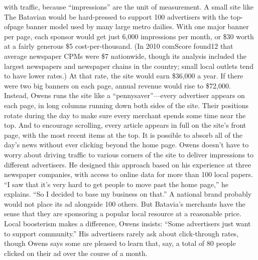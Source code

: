 with traffic, because ``impressions'' are the unit of measurement. A small site like
The Batavian would be hard-pressed to support 100 advertisers with the top-ofpage
banner model used by many large metro dailies. With one major banner per
page, each sponsor would get just 6,000 impressions per month, or \$30 worth at
a fairly generous \$5 cost-per-thousand. (In 2010 comScore found12 that average
newspaper CPMs were \$7 nationwide, though its analysis included the largest
newspapers and newspaper chains in the country; small local outlets tend to have
lower rates.) At that rate, the site would earn \$36,000 a year. If there were two big
banners on each page, annual revenue would rise to \$72,000.
Instead, Owens runs the site like a ``pennysaver''—every advertiser appears on
each page, in long columns running down both sides of the site. Their positions
rotate during the day to make sure every merchant spends some time near the
top. And to encourage scrolling, every article appears in full on the site's front
page, with the most recent items at the top. It is possible to absorb all of the day's
news without ever clicking beyond the home page. Owens doesn't have to worry
about driving traffic to various corners of the site to deliver impressions to different
advertisers. He designed this approach based on his experience at three
newspaper companies, with access to online data for more than 100 local papers.
``I saw that it's very hard to get people to move past the home page,'' he explains.
``So I decided to base my business on that.''
A national brand probably would not place its ad alongside 100 others. But
Batavia's merchants have the sense that they are sponsoring a popular local resource
at a reasonable price. Local boosterism makes a difference, Owens insists:
``Some advertisers just want to support community.'' His advertisers rarely ask
about click-through rates, though Owens says some are pleased to learn that, say,
a total of 80 people clicked on their ad over the course of a month.

